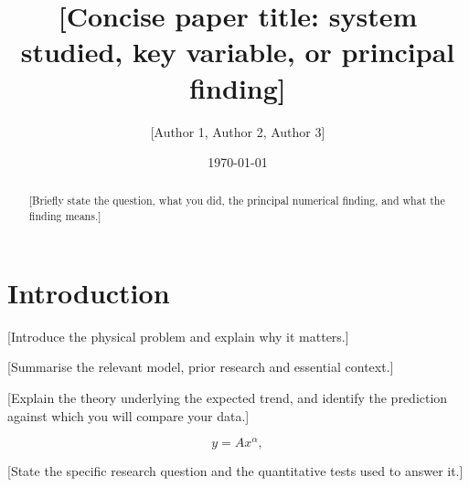 \documentclass[
 reprint,
 amsmath,amssymb,
 aps,
]{revtex4-2}
\begin{document}
\title{[Concise paper title: system studied, key variable, or principal finding]}
\author{[Author 1, Author 2, Author 3]}
\date{\today}

\begin{abstract}
[Briefly state the question, what you did, the principal numerical
finding, and what the finding means.]
\end{abstract}
\maketitle

\section{Introduction}
\label{sec:introduction}

[Introduce the physical problem and explain why it matters.]

[Summarise the relevant model, prior research and essential context.]

[Explain the theory underlying the expected trend, and identify the
prediction against which you will compare your data.]

\begin{equation}
\label{eq:theory}
 y = A x^{\alpha},
\end{equation}

[State the specific research question and the quantitative tests used
to answer it.]
\end{document}
